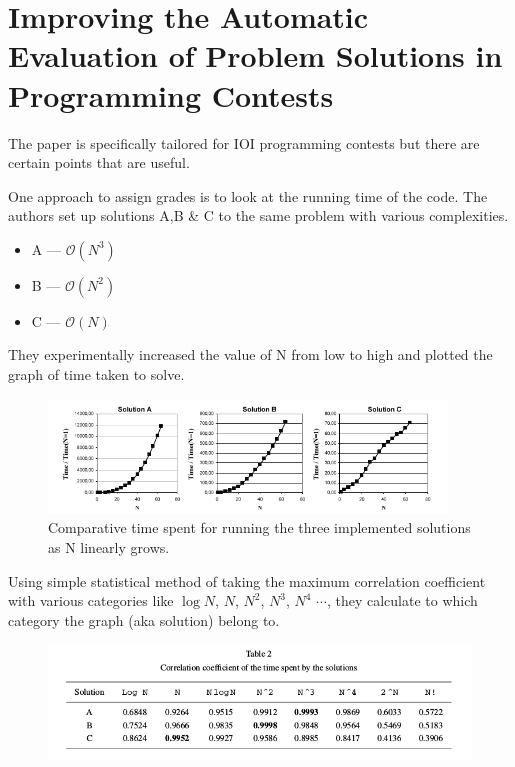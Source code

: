 \documentclass{article}
\begin{document}
\section{Improving the Automatic Evaluation of Problem
Solutions in Programming Contests \cite{ribeiro2009improving}} 

The paper is specifically tailored for IOI programming contests but there are certain points that are useful.

One approach to assign grades is to look at the running time of the code. The authors set up solutions A,B \& C to the same problem with various complexities.

\begin{itemize}
    \item A --- $\mathcal{O}(N^3)$
    \item B --- $\mathcal{O}(N^2)$
    \item C --- $\mathcal{O}(N)$
\end{itemize}

They experimentally increased the value of N from low to high and plotted the graph of time taken to solve.

\begin{figure}[H]
    \centering
    \includegraphics[height=1.2in]{Images/complexity_graphs.png}
    \caption{Comparative time spent for running the three implemented solutions as N linearly grows.}
\end{figure}

Using simple statistical method of taking the maximum correlation coefficient with various categories like $\log N$, $N$, $N^2$, $N^3$, $N^4$ $\cdots$, they calculate to which category the graph (aka solution) belong to.\\

\begin{figure}[H]
    \centering
    \includegraphics[height=1.2in]{table_corr_complexity.png}
\end{figure}
\end{document}
